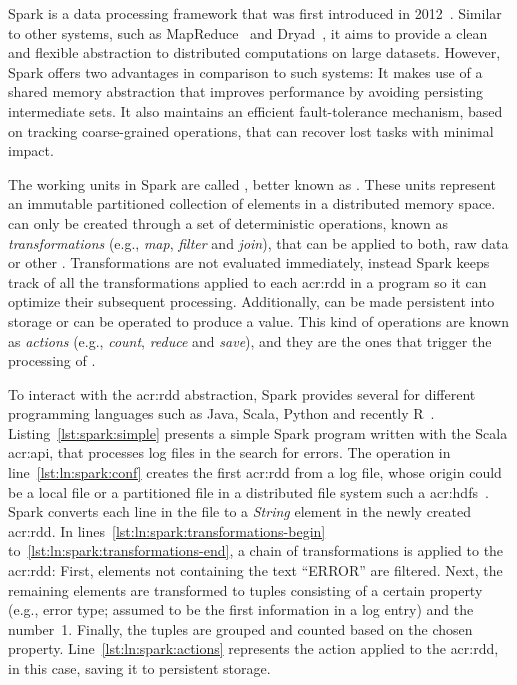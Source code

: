 \label{sec:spark}


Spark is a data processing framework that was first introduced in 2012~\cite{Zaharia2012a}. Similar to other systems, such as MapReduce~\cite{Dean2004} and Dryad~\cite{Isard2007}, it aims to provide a clean and flexible abstraction to distributed computations on large datasets. However, Spark offers two advantages in comparison to such systems: It makes use of a shared memory abstraction that improves performance by avoiding persisting intermediate sets. It also maintains an efficient fault-tolerance mechanism, based on tracking coarse-grained operations, that can recover lost tasks with minimal impact.

The working units in Spark are called \textit{}, better known as . These units represent an immutable partitioned collection of elements in a distributed memory space.  can only be created through a set of deterministic operations, known as \textit{transformations} (e.g., \textit{map}, \textit{filter} and \textit{join}), that can be applied to both, raw data or other . Transformations are not evaluated immediately, instead Spark keeps track of all the transformations applied to each \acrshort{acr:rdd} in a program so it can optimize their subsequent processing. Additionally,  can be made persistent into storage or can be operated to produce a value. This kind of operations are known as \textit{actions} (e.g., \textit{count}, \textit{reduce} and \textit{save}), and they are the ones that trigger the processing of .

To interact with the \acrshort{acr:rdd} abstraction, Spark provides several  for different programming languages such as Java, Scala, Python and recently R~\cite{Venkataraman2016}. Listing~\ref{lst:spark:simple} presents a simple Spark program written with the Scala \acrshort{acr:api}, that processes log files in the search for errors. The operation in line~\ref{lst:ln:spark:conf} creates the first \acrshort{acr:rdd} from a log file, whose origin could be a local file or a partitioned file in a distributed file system such a \acrfull{acr:hdfs}~\cite{WebHadoop2017}. Spark converts each line in the file to a \textit{String} element in the newly created \acrshort{acr:rdd}. In lines~\ref{lst:ln:spark:transformations-begin} to~\ref{lst:ln:spark:transformations-end}, a chain of transformations is applied to the \acrshort{acr:rdd}: First, elements not containing the text ``ERROR'' are filtered. Next, the remaining elements are transformed to tuples consisting of a certain property (e.g., error type; assumed to be the first information in a log entry) and the number~1. Finally, the tuples are grouped and counted based on the chosen property. Line~\ref{lst:ln:spark:actions} represents the action applied to the \acrshort{acr:rdd}, in this case, saving it to persistent storage.

